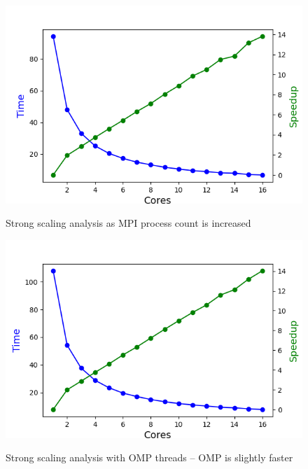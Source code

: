 \begin{figure}[h]
\begin{minipage}{0.45\linewidth}
    \end{minipage}
  \begin{minipage}{0.45\linewidth}
      \includegraphics[width=\linewidth]{figs/mpi_strong.out}
      \caption{Strong scaling analysis as MPI process count is increased}
      \label{fig:mpi_strong}
    \end{minipage}
  \hspace{.05\linewidth}
 \begin{minipage}{0.45\linewidth}
  \includegraphics[width=\linewidth]{figs/omp_strong.out}
  \caption{Strong scaling analysis with OMP threads -- OMP is slightly faster}
    \label{fig:omp_strong}
    \end{minipage}
\end{figure}

